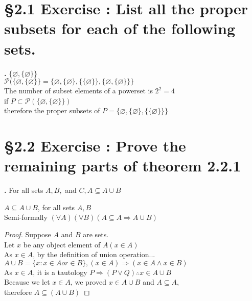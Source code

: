 \documentclass[a4paper,11pt]{article}
\begin{document}
\addtocounter{ProblemCounter}{2}
\setcounter{SubsectionCounter}{2}
\section*{\S 2.1 Exercise : List all the proper subsets for each of the following sets. }
\textbf{.}
\(\{\varnothing, \{\varnothing\}\}\)\\
\(\mathcal{P}(\{\varnothing, \{\varnothing\}\} = \{\varnothing, \{\varnothing\}, \{\{\varnothing\}\}, 
\{\varnothing,\{\varnothing\}\}\}\)\\
The number of subset elements of a powerset is \(2^2 = 4\)\\
if \(P \subset \mathcal{P}(\{\varnothing, \{\varnothing\}\})\)\\
therefore the proper subsets of \(P = \{\varnothing, \{\varnothing\}, \{\{\varnothing\}\}\}\)\\

\newpage

\setcounter{ProblemCounter}{7}
\setcounter{SubsectionCounter}{1}
\section*{\S 2.2 Exercise : Prove the remaining parts of theorem 2.2.1 }
\textbf{.}
For all sets \(A, B, \) and \(C, A \subseteq A \cup B\)
\begin{theorem4}
\(A \subseteq A \cup B\), for all sets \(A, B\)\\
Semi-formally \((\forall A)(\forall B)(A \subseteq A \Rightarrow A \cup B)\)
\begin{proof}
Suppose \(A\) and \(B\) are sets.\\
Let \(x\) be any object element of \(A (x \in A)\)\\
As \(x \in A\), by the definition of union operation...\\
\(A \cup B = \{x: x \in A or \in B\}, (x \in A) \Rightarrow (x \in A \wedge x \in 
B)\)\\
As \(x \in A\), it is a tautology \(P \Rightarrow (P \vee Q)\therefore x \in A \cup 
B\)\\
Because we let \(x \in A\), we proved \(x \in A \cup B\) and \(A \subseteq A\),\\
therefore \(A \subseteq (A \cup B)\)
\end{proof}
\end{theorem4}
\end{document}
